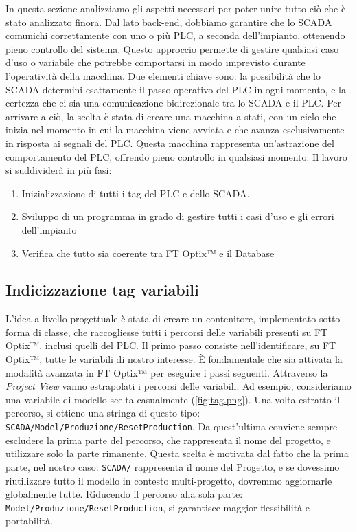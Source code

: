 In questa sezione analizziamo gli aspetti necessari per poter unire tutto ciò che è stato analizzato finora. Dal lato back-end, dobbiamo garantire che lo SCADA comunichi correttamente con uno o più PLC, a seconda dell'impianto, ottenendo pieno controllo del sistema. Questo approccio permette di gestire qualsiasi caso d'uso o variabile che potrebbe comportarsi in modo imprevisto durante l'operatività della macchina. Due elementi chiave sono: la possibilità che lo SCADA determini esattamente il passo operativo del PLC in ogni momento, e la certezza che ci sia una comunicazione bidirezionale tra lo SCADA e il PLC. Per arrivare a ciò, la scelta è stata di creare una macchina a stati, con un ciclo che inizia nel momento in cui la macchina viene avviata e che avanza esclusivamente in risposta ai segnali del PLC. Questa macchina rappresenta un'astrazione del comportamento del PLC, offrendo pieno controllo in qualsiasi momento. Il lavoro si suddividerà in più fasi:
\begin{enumerate}
    \item Inizializzazione di tutti i tag del PLC e dello SCADA.
    \item Sviluppo di un programma in grado di gestire tutti i casi d'uso e gli errori dell'impianto
    \item Verifica che tutto sia coerente tra FT Optix™ e il Database
\end{enumerate}

\subsection{Indicizzazione tag variabili}

L'idea a livello progettuale è stata di creare un contenitore, implementato sotto forma di classe, che raccogliesse tutti i percorsi delle variabili presenti su FT Optix™, inclusi quelli del PLC. Il primo passo consiste nell'identificare, su FT Optix™, tutte le variabili di nostro interesse. È fondamentale che sia attivata la modalità avanzata in FT Optix™ per eseguire i passi seguenti. Attraverso la \textit{Project View} vanno estrapolati i percorsi delle variabili. Ad esempio, consideriamo una variabile di modello scelta casualmente (\ref{fig:tag.png}). Una volta estratto il percorso, si ottiene una stringa di questo tipo: \verb|SCADA/Model/Produzione/ResetProduction|. Da quest'ultima conviene sempre escludere la prima parte del percorso, che rappresenta il nome del progetto, e utilizzare solo la parte rimanente. Questa scelta è motivata dal fatto che la prima parte, nel nostro caso: \verb|SCADA/| rappresenta il nome del Progetto, e se dovessimo riutilizzare tutto il modello in contesto multi-progetto, dovremmo aggiornarle globalmente tutte. Riducendo il percorso alla sola parte: \verb|Model/Produzione/ResetProduction|, si garantisce maggior flessibilità e portabilità. 


